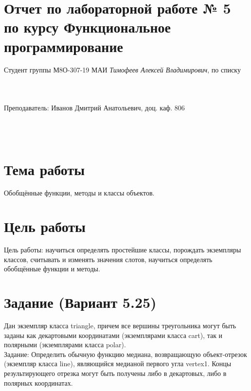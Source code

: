 \documentclass[12pt]{article}
\begin{document}
\section*{Отчет по лабораторной работе № 5 \\
по курсу \guillemotleft Функциональное программирование\guillemotright}
\begin{flushright}
Студент группы М8О-307-19 МАИ \textit{Тимофеев Алексей Владимирович},  по списку \\
 \\
 \\
\ \\
Преподаватель: Иванов Дмитрий Анатольевич, доц. каф. 806 \\
 \\
 \\
 \\

\end{flushright}

\section{Тема работы}
Обобщённые функции, методы и классы объектов.

\section{Цель работы}
Цель работы: научиться определять простейшие классы, порождать экземпляры классов, считывать и изменять значения слотов, научиться определять обобщённые функции и методы.

\section{Задание (Вариант 5.25)}

Дан экземпляр класса triangle, причем все вершины треугольника могут быть заданы как декартовыми координатами (экземплярами класса cart), так и полярными (экземплярами класса polar).\\

Задание: Определить обычную функцию медиана, возвращающую объект-отрезок (экземпляр класса line), являющийся медианой первого угла vertex1. Концы результирующего отрезка могут быть получены либо в декартовых, либо в полярных координатах.\\
\end{document}
